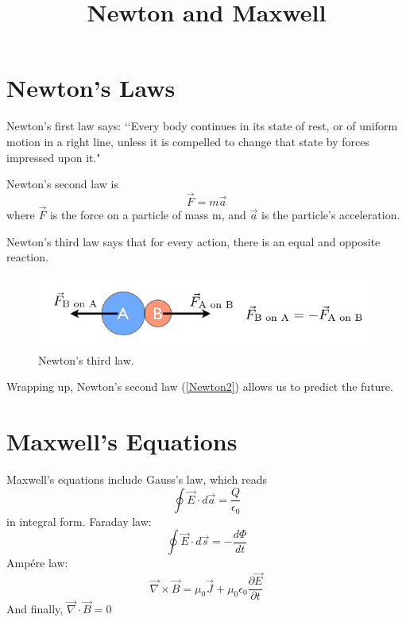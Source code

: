 \documentclass{emulateapj}
\title{Newton and Maxwell}
\date{}
\newcommand\be{\begin{equation}}
\newcommand\ee{\end{equation}}
\begin{document}
\maketitle

\section{Newton’s Laws} 
Newton’s first law says: ‘‘Every body continues in its state of rest, 
or of uniform motion in a right line, unless it is compelled to change 
that state by forces impressed upon it."

Newton’s second law is 
\be
\vec F = m \vec a \label{Newton2}
\ee
where $\vec F$ is the force on a particle of mass m, 
and $\vec a$ is the particle’s acceleration.

Newton's third law says that for every action, there is an equal and opposite reaction.

\begin{center}
\begin{figure}[h]
\includegraphics[scale = 0.35]{n3l.png}
\caption{Newton's third law.}
\end{figure}
\end{center}

Wrapping up, Newton's second law (\ref{Newton2}) allows us to predict the future.

\section{Maxwell’s Equations} 
Maxwell’s equations include Gauss’s law, which reads 
\be
\oint \vec E \cdot d\vec a = \frac{Q}{\epsilon_0} 
\ee
in integral form.\newline
Faraday law:
\be
\oint \vec E \cdot d\vec s = -\frac{d\Phi}{dt} 
\ee
Amp\'ere law:
\be
\vec \nabla \times \vec B = \mu_0 \vec J + \mu_0 \epsilon_0 \frac{\partial \vec E}{\partial t} 
\ee
And finally, $\vec \nabla \cdot \vec B = 0$
\end{document}
